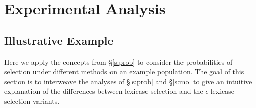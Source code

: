 \documentclass[twoside]{article}
\newcommand{\edit}[1]{{\color{red} #1}}
\begin{document}
%
%
%

\edit{\section{Experimental Analysis}}
\subsection{Illustrative Example}\label{s:ex}
Here we apply the concepts from \S\ref{s:prob} to consider the probabilities of selection under different methods on an example population. The goal of this section is to interweave the analyses of \S\ref{s:prob} and \S\ref{s:mo} to give an intuitive explanation of the differences between lexicase selection and the $\epsilon$-lexicase selection variants. 
\end{document}
